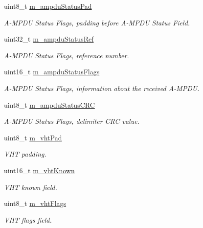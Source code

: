 \begin{DoxyCompactItemize}
uint8\+\_\+t \hyperlink{classns3_1_1RadiotapHeader_a229fb0939d24f5f2ea73c31c228b0fb1}{m\+\_\+ampdu\+Status\+Pad}
\begin{DoxyCompactList}\small\item\em A-\/\+M\+P\+DU Status Flags, padding before A-\/\+M\+P\+DU Status Field. \end{DoxyCompactList}\item 
uint32\+\_\+t \hyperlink{classns3_1_1RadiotapHeader_a8be72c0459a3f52b873bb3cc8899885c}{m\+\_\+ampdu\+Status\+Ref}
\begin{DoxyCompactList}\small\item\em A-\/\+M\+P\+DU Status Flags, reference number. \end{DoxyCompactList}\item 
uint16\+\_\+t \hyperlink{classns3_1_1RadiotapHeader_a17349b310a739e281683073ee042ceab}{m\+\_\+ampdu\+Status\+Flags}
\begin{DoxyCompactList}\small\item\em A-\/\+M\+P\+DU Status Flags, information about the received A-\/\+M\+P\+DU. \end{DoxyCompactList}\item 
uint8\+\_\+t \hyperlink{classns3_1_1RadiotapHeader_a05ed1ce716402a0c1609a3203d4fbccb}{m\+\_\+ampdu\+Status\+C\+RC}
\begin{DoxyCompactList}\small\item\em A-\/\+M\+P\+DU Status Flags, delimiter C\+RC value. \end{DoxyCompactList}\item 
uint8\+\_\+t \hyperlink{classns3_1_1RadiotapHeader_ae9875044826afec2aefbaaa79672faa7}{m\+\_\+vht\+Pad}
\begin{DoxyCompactList}\small\item\em V\+HT padding. \end{DoxyCompactList}\item 
uint16\+\_\+t \hyperlink{classns3_1_1RadiotapHeader_ae0560a9f80ce1e8693a88ba3a233e09d}{m\+\_\+vht\+Known}
\begin{DoxyCompactList}\small\item\em V\+HT known field. \end{DoxyCompactList}\item 
uint8\+\_\+t \hyperlink{classns3_1_1RadiotapHeader_ae1f2319399552e40d53d888516bf7445}{m\+\_\+vht\+Flags}
\begin{DoxyCompactList}\small\item\em V\+HT flags field. \end{DoxyCompactList}\item 

\end{DoxyCompactItemize}
